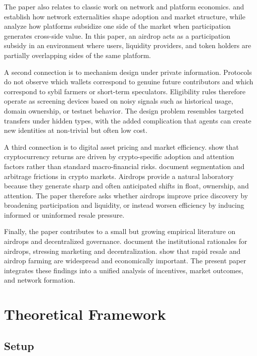 \documentclass[11pt]{article}
\theoremstyle{remark}
\begin{document}
The paper also relates to classic work on network and platform economics. \citet{katz1985network} and \citet{katz1986technology} establish how network externalities shape adoption and market structure, while \citet{rochet2003platform} analyze how platforms subsidize one side of the market when participation generates cross-side value. In this paper, an airdrop acts as a participation subsidy in an environment where users, liquidity providers, and token holders are partially overlapping sides of the same platform.

A second connection is to mechanism design under private information. Protocols do not observe which wallets correspond to genuine future contributors and which correspond to sybil farmers or short-term speculators. Eligibility rules therefore operate as screening devices based on noisy signals such as historical usage, domain ownership, or testnet behavior. The design problem resembles targeted transfers under hidden types, with the added complication that agents can create new identities at non-trivial but often low cost.

A third connection is to digital asset pricing and market efficiency. \citet{liu2021risks} show that cryptocurrency returns are driven by crypto-specific adoption and attention factors rather than standard macro-financial risks. \citet{makarov2020trading} document segmentation and arbitrage frictions in crypto markets. Airdrops provide a natural laboratory because they generate sharp and often anticipated shifts in float, ownership, and attention. The paper therefore asks whether airdrops improve price discovery by broadening participation and liquidity, or instead worsen efficiency by inducing informed or uninformed resale pressure.

Finally, the paper contributes to a small but growing empirical literature on airdrops and decentralized governance. \citet{allen2023why} document the institutional rationales for airdrops, stressing marketing and decentralization. \citet{messias2025airdrops} show that rapid resale and airdrop farming are widespread and economically important. The present paper integrates these findings into a unified analysis of incentives, market outcomes, and network formation.

\section{Theoretical Framework}

\subsection{Setup}
\end{document}
